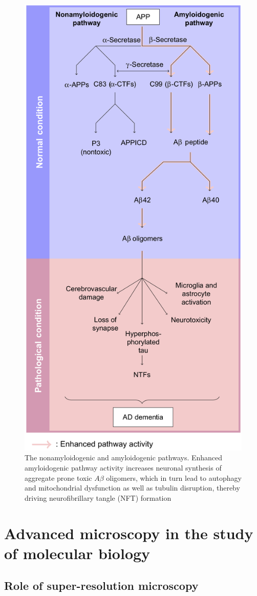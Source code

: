 \begin{figure}[!htbp]
  \center
  \includegraphics[width=0.7\linewidth]{figures/10_amyloidogenic_pathway}
  \caption{The nonamyloidogenic and amyloidogenic pathways. Enhanced amyloidogenic pathway activity increases neuronal synthesis of aggregate prone toxic $A\beta$ oligomers, which in turn lead to autophagy and mitochondrial dysfunction as well as tubulin disruption, thereby driving neurofibrillary tangle (NFT) formation}
  \label{fig:10_amyloidogenic_pathway}
\end{figure}

\section{Advanced microscopy in the study of molecular biology}
\subsection{Role of super-resolution microscopy }

